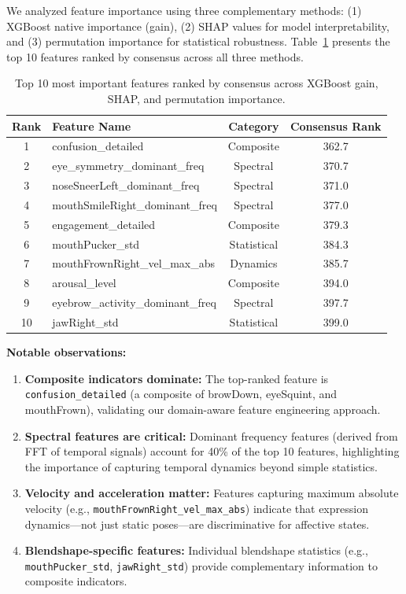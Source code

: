 We analyzed feature importance using three complementary methods: (1) XGBoost native importance (gain), (2) SHAP values for model interpretability, and (3) permutation importance for statistical robustness. Table~\ref{tab:top-features} presents the top 10 features ranked by consensus across all three methods.

\begin{table}[t]
\centering
\caption{Top 10 most important features ranked by consensus across XGBoost gain, SHAP, and permutation importance.}
\label{tab:top-features}
\begin{tabular}{clcc}
\toprule
\textbf{Rank} & \textbf{Feature Name} & \textbf{Category} & \textbf{Consensus Rank} \\
\midrule
1 & confusion\_detailed & Composite & 362.7 \\
2 & eye\_symmetry\_dominant\_freq & Spectral & 370.7 \\
3 & noseSneerLeft\_dominant\_freq & Spectral & 371.0 \\
4 & mouthSmileRight\_dominant\_freq & Spectral & 377.0 \\
5 & engagement\_detailed & Composite & 379.3 \\
6 & mouthPucker\_std & Statistical & 384.3 \\
7 & mouthFrownRight\_vel\_max\_abs & Dynamics & 385.7 \\
8 & arousal\_level & Composite & 394.0 \\
9 & eyebrow\_activity\_dominant\_freq & Spectral & 397.7 \\
10 & jawRight\_std & Statistical & 399.0 \\
\bottomrule
\end{tabular}
\end{table}

\textbf{Notable observations:}
\begin{enumerate}
    \item \textbf{Composite indicators dominate:} The top-ranked feature is \texttt{confusion\_detailed} (a composite of browDown, eyeSquint, and mouthFrown), validating our domain-aware feature engineering approach.
    
    \item \textbf{Spectral features are critical:} Dominant frequency features (derived from FFT of temporal signals) account for 40\% of the top 10 features, highlighting the importance of capturing temporal dynamics beyond simple statistics.
    
    \item \textbf{Velocity and acceleration matter:} Features capturing maximum absolute velocity (e.g., \texttt{mouthFrownRight\_vel\_max\_abs}) indicate that expression dynamics---not just static poses---are discriminative for affective states.
    
    \item \textbf{Blendshape-specific features:} Individual blendshape statistics (e.g., \texttt{mouthPucker\_std}, \texttt{jawRight\_std}) provide complementary information to composite indicators.
\end{enumerate}

